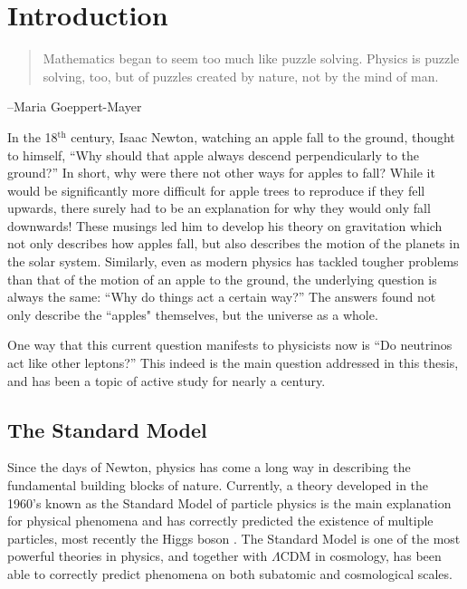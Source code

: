 \chapter{Introduction}
\begin{quote}
Mathematics began to seem too much like puzzle solving. Physics is puzzle solving, too, but of puzzles created by nature, not by the mind of man.
\end{quote}
\begin{flushright}
--Maria Goeppert-Mayer
\end{flushright}

In the 18$^\textrm{th}$ century, Isaac Newton,  watching an apple fall to the ground, thought to himself, ``Why should that apple always descend perpendicularly to the ground?''
In short, why were there not other ways for apples to fall? While it would be significantly more difficult for apple trees to reproduce if they fell upwards, there surely had to be an explanation for why they would only fall downwards!
These musings led him to develop his theory on gravitation which not only describes how apples fall, but also describes the motion of the planets in the solar system.
Similarly, even as modern physics has tackled tougher problems than that of the motion of an apple to the ground, the underlying question is always the same: ``Why do things act a certain way?''
The answers found not only describe the ``apples" themselves, but the universe as a whole.

One way that this current question manifests to physicists now is ``Do neutrinos act like other leptons?''
This indeed is the main question addressed in this thesis, and has been a topic of active study for nearly a century.

\section{The Standard Model}
Since the days of Newton, physics has come a long way in describing the fundamental building blocks of nature.
Currently, a theory developed in the 1960's known as the Standard Model of particle physics is the main explanation for physical phenomena and has correctly predicted the existence of multiple particles, most recently the Higgs boson \cite{Aad:2012tfa, Chatrchyan:2012xdj}.
The Standard Model is one of the most powerful theories in physics, and together with $\Lambda$CDM in cosmology, has been able to correctly predict phenomena on both subatomic and cosmological scales.


